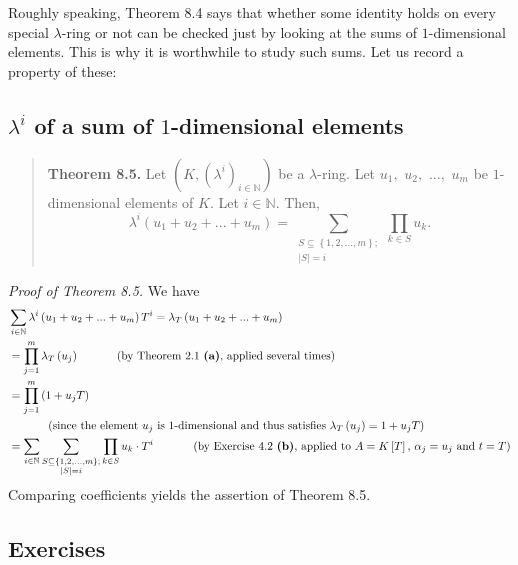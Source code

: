 \documentclass[numbers=enddot,12pt,final,onecolumn,notitlepage]{scrartcl}%
\begin{document}
Roughly speaking, Theorem 8.4 says that whether some identity holds on every
special $\lambda$-ring or not can be checked just by looking at the sums of
$1$-dimensional elements. This is why it is worthwhile to study such sums. Let
us record a property of these:

\subsection{$\lambda^{i}$ of a sum of $1$-dimensional elements}

\begin{quote}
\textbf{Theorem 8.5.} Let $\left(  K,\left(  \lambda^{i}\right)
_{i\in\mathbb{N}}\right)  $ be a $\lambda$-ring. Let $u_{1},$ $u_{2},$ $...,$
$u_{m}$ be $1$-dimensional elements of $K$. Let $i\in\mathbb{N}$. Then,%
\[
\lambda^{i}\left(  u_{1}+u_{2}+...+u_{m}\right)  =\sum_{\substack{S\subseteq
\left\{  1,2,...,m\right\}  ;\\\left\vert S\right\vert =i}}\prod_{k\in S}%
u_{k}.
\]



\end{quote}

\textit{Proof of Theorem 8.5.} We have%
\begin{align*}
&  \sum_{i\in\mathbb{N}}\lambda^{i}\left(  u_{1}+u_{2}+...+u_{m}\right)
T^{i}=\lambda_{T}\left(  u_{1}+u_{2}+...+u_{m}\right) \\
&  =\prod_{j=1}^{m}\lambda_{T}\left(  u_{j}\right)
\ \ \ \ \ \ \ \ \ \ \left(  \text{by Theorem 2.1 \textbf{(a)}, applied several
times}\right) \\
&  =\prod_{j=1}^{m}\left(  1+u_{j}T\right) \\
&  \ \ \ \ \ \ \ \ \ \ \left(  \text{since the element }u_{j}\text{ is
}1\text{-dimensional and thus satisfies }\lambda_{T}\left(  u_{j}\right)
=1+u_{j}T\right) \\
&  =\sum_{i\in\mathbb{N}}\sum\limits_{\substack{S\subseteq\left\{
1,2,...,m\right\}  ;\\\left\vert S\right\vert =i}}\prod\limits_{k\in S}%
u_{k}\cdot T^{i}\ \ \ \ \ \ \ \ \ \ \left(  \text{by Exercise 4.2
\textbf{(b)}, applied to }A=K\left[  T\right]  \text{, }\alpha_{j}=u_{j}\text{
and }t=T\right)
\end{align*}
Comparing coefficients yields the assertion of Theorem 8.5.

\subsection{Exercises}
\end{document}
